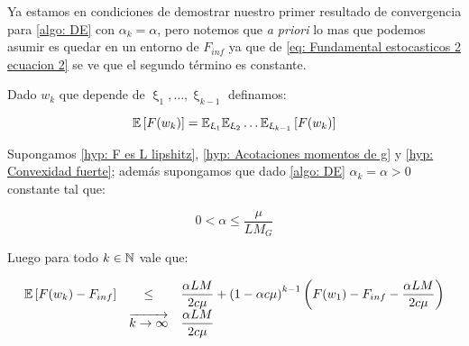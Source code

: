 Ya estamos en condiciones de demostrar nuestro primer resultado de convergencia para \ref{algo: DE} con $\alpha_k = \alpha$, pero notemos que \textit{a priori} lo mas que podemos asumir es quedar en un entorno de $F_{inf}$ ya que de \ref{eq: Fundamental estocasticos 2 ecuacion 2} se ve que el segundo t\'ermino es constante.

Dado $w_k$ que depende de $\upxi_{1}, \dots, \upxi_{k-1}$ definamos:

\begin{equation*}
	\label{def: esperanza total}
	\mathbb{E} \left[F(w_k)\right] = \mathbb{E}_{\upxi_{1}}\mathbb{E}_{\upxi_{2}}\dots \mathbb{E}_{\upxi_{k-1}}\left[F(w_k)\right]
\end{equation*}

\begin{theorem}
	\label{theorem: DE en fuertemente convexo y alfa fijo converge en l1}
	Supongamos \ref{hyp: F es L lipshitz}, \ref{hyp: Acotaciones momentos de g} y \ref{hyp: Convexidad fuerte}; adem\'as supongamos que dado \ref{algo: DE} $\alpha_k = \alpha >0 $ constante tal que:
	
	\begin{equation}
	\label{eq: Condicion alfa Conv L1 fuertemente convexo}
	0  < \alpha \leq \dfrac{\mu}{LM_G} 
	\end{equation}
	
	Luego para todo $k \in {\mathbb{N}}$ vale que:
	
	\begin{equation*}
	\begin{array}{rcl}
	\mathbb{E} \left[F(w_k) - F_{inf}\right] & \leq & \dfrac{\alpha LM}{2 c \mu} + \left(1 - \alpha c \mu \right)^{k-1} \left(F(w_1) - F_{inf} - \dfrac{\alpha LM}{2 c \mu} \right) \\
	& \overrightarrow{k \rightarrow \infty} & \dfrac{\alpha LM}{2 c \mu} 
	\end{array}
	\end{equation*}
	 
\end{theorem}

